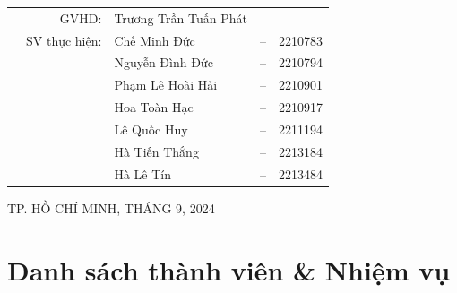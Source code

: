 \documentclass[a4paper]{article}
\begin{document}
\begin{titlepage}
	\begin{table}[h]
		\centering
		\begin{tabular}{rrlcl}
			\hspace{2.25 cm} & GVHD: & Trương Trần Tuấn Phát & & \\
			& SV thực hiện: & Chế Minh Đức & -- & 2210783 \\
            & & Nguyễn Đình Đức & -- & 2210794 \\
            & & Phạm Lê Hoài Hải & -- & 2210901 \\
            & & Hoa Toàn Hạc & -- & 2210917 \\
            & & Lê Quốc Huy & -- & 2211194\\
            & & Hà Tiến Thắng & -- & 2213184 \\
            & & Hà Lê Tín & -- & 2213484 \\
            
            
		\end{tabular}
	\end{table}


\begin{center}
{\footnotesize TP. HỒ CHÍ MINH, THÁNG 9, 2024}
\end{center}
\end{titlepage}


\section*{Danh sách thành viên \& Nhiệm vụ }
\end{document}
